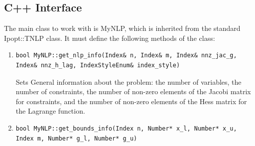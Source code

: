 \documentclass[11pt,fleqn,a4paper]{scrartcl}
\begin{document}
\subsection{C++ Interface}
The main class to work with is MyNLP, which is inherited from the standard Ipopt::TNLP class. It must define the following methods of the class:
\begin{enumerate}
\item
\begin{verbatim}bool MyNLP::get_nlp_info(Index& n, Index& m, Index& nnz_jac_g,
Index& nnz_h_lag, IndexStyleEnum& index_style)
\end{verbatim}

Sets General information about the problem: the number of variables, the number of constraints, the number of non-zero elements of the Jacobi matrix for constraints, and the number of non-zero elements of the Hess matrix for the Lagrange function.
\item
\begin{verbatim}
bool MyNLP::get_bounds_info(Index n, Number* x_l, Number* x_u,
Index m, Number* g_l, Number* g_u)
\end{verbatim}


\end{enumerate}
\end{document}
